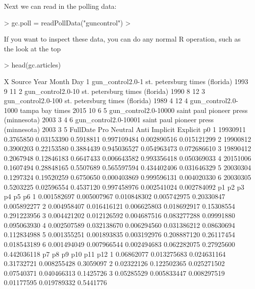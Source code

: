 \documentclass{article}
\begin{document}
Next we can read in the polling data:

\begin{Schunk}
\begin{Sinput}
> gc.poll = readPollData("guncontrol")
>   
\end{Sinput}
\end{Schunk}

If you want to inspect these data, you can do any normal R operation,
such as the look at the top

\begin{Schunk}
\begin{Sinput}
> head(gc.articles)
\end{Sinput}
\begin{Soutput}
                     X                               Source Year Month Day
1     gun_control2.0-1       st. petersburg times (florida) 1993     9  11
2    gun_control2.0-10       st. petersburg times (florida) 1990     8  12
3   gun_control2.0-100       st. petersburg times (florida) 1989     4  12
4  gun_control2.0-1000                      tampa bay times 2015    10   6
5 gun_control2.0-10000 saint paul pioneer press (minnesota) 2003     3   4
6 gun_control2.0-10001 saint paul pioneer press (minnesota) 2003     3   5
  FullDate       Pro    Neutral      Anti    Implicit    Explicit          p0
1 19930911 0.3765850 0.03153390 0.5918811 0.997109484 0.002890516 0.015121299
2 19900812 0.3900203 0.22153580 0.3884439 0.945036527 0.054963473 0.072686610
3 19890412 0.2067948 0.12846183 0.6647433 0.006643582 0.993356418 0.050369033
4 20151006 0.1607494 0.28848165 0.5507689 0.565597594 0.434402406 0.031646329
5 20030304 0.1297324 0.19520259 0.6750650 0.000403869 0.999596131 0.004020330
6 20030305 0.5203225 0.02596554 0.4537120 0.997458976 0.002541024 0.002784092
           p1          p2          p3          p4         p5          p6
1 0.001582697 0.005007967 0.010848302 0.005742975 0.20330847 0.005892277
2 0.004958407 0.016416121 0.006625803 0.018692917 0.15308554 0.291223956
3 0.004421202 0.012126592 0.004687516 0.083277288 0.09991880 0.095063930
4 0.002507589 0.032138670 0.006294560 0.031386212 0.08630694 0.112834988
5 0.001355251 0.001893835 0.003192976 0.208887120 0.26117454 0.018543189
6 0.001494049 0.007966544 0.002494683 0.062282075 0.27925600 0.442036118
          p7          p8          p9        p10         p11       p12
1 0.06862077 0.013275683 0.024631164 0.31732721 0.008255428 0.3059097
2 0.02322126 0.122502365 0.025271502 0.07540371 0.040466313 0.1425726
3 0.05285529 0.005833447 0.008297519 0.01177595 0.019789332 0.5441776

\end{Soutput}
\end{Schunk}
\end{document}
